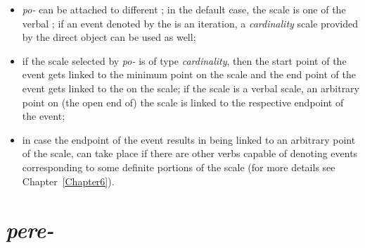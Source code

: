 \begin{itemize}
\item \textit{po-} can be attached to different ; in the default case, the scale is one of the verbal ; if an event denoted by the  is an iteration, a \textit{cardinality} scale provided by the direct object can be used as well;
\item if the scale selected by \textit{po-} is of type \textit{cardinality}, then the start point of the event gets linked to the minimum point on the scale and the end point of the event gets linked to the  on the scale; if the scale is a verbal scale, an arbitrary point on (the open end of) the scale is linked to the respective endpoint of the event;
\item in case the endpoint of the event results in being linked to an arbitrary point of the scale,  can take place if there are other verbs capable of denoting events corresponding to some definite portions of the scale (for more details see Chapter~\ref{Chapter6}).
\end{itemize}



\section{\textit{pere-}}\label{subsection:semantics:pere}

